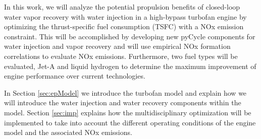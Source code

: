 \documentclass[conf]{new-aiaa}
\begin{document}
In this work, we will analyze the potential propulsion benefits of closed-loop water vapor recovery with water injection in a high-bypass turbofan engine by optimizing the thrust-specific fuel consumption (TSFC) with a NOx emission constraint.
This will be accomplished by developing new pyCycle components for water injection and vapor recovery and will use empirical NOx formation correlations to evaluate NOx emissions.
Furthermore, two fuel types will be evaluated, Jet-A and liquid hydrogen to determine the maximum improvement of engine performance over current technologies.

In Section \ref{sec:epModel} we introduce the turbofan model and explain how we will introduce the water injection and water recovery components within the model.
Section \ref{sec:imp} explains how the multidisciplinary optimization will be implemented to take into account the different operating conditions of the engine model and the associated NOx emissions.
\end{document}
